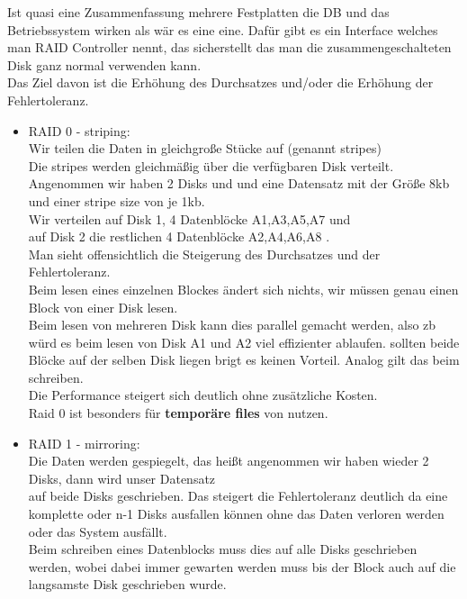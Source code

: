 \documentclass[12pt]{article}\pagestyle{myheadings}
\theoremstyle{plain}
\begin{document}
\begin{enumerate}
Ist quasi eine Zusammenfassung mehrere Festplatten die DB und das Betriebssystem wirken als wär es eine eine.
Dafür gibt es ein Interface welches man RAID Controller nennt, das sicherstellt das man die zusammengeschalteten Disk ganz normal verwenden kann.\\
Das Ziel davon ist die Erhöhung des Durchsatzes und/oder die Erhöhung der Fehlertoleranz.\\
\begin{itemize}
\item RAID 0 - striping:\\
Wir teilen die Daten in gleichgroße Stücke auf (genannt \textsf{stripes}) \\
Die stripes werden gleichmäßig über die verfügbaren Disk verteilt.\\
Angenommen wir haben 2 Disks und und eine Datensatz mit der Größe 8kb und einer stripe size von je  1kb.\\
Wir verteilen auf Disk 1, 4 Datenblöcke A1,A3,A5,A7 und\\ auf Disk 2 die restlichen 4 Datenblöcke A2,A4,A6,A8 .\\
Man sieht offensichtlich die Steigerung des Durchsatzes und der Fehlertoleranz.\\
Beim lesen eines einzelnen Blockes ändert sich nichts, wir müssen genau einen Block von einer Disk lesen.\\
Beim lesen von mehreren Disk kann dies parallel gemacht werden, also zb würd es beim lesen von Disk A1 und A2 viel effizienter ablaufen. sollten beide Blöcke auf der selben Disk liegen brigt es keinen Vorteil.
Analog gilt das beim schreiben.\\
Die Performance steigert sich deutlich ohne zusätzliche Kosten.\\
Raid 0 ist besonders für \textbf{temporäre files} von nutzen.\\
\item RAID 1 - mirroring:\\
Die Daten werden gespiegelt, das heißt angenommen wir haben wieder 2 Disks, dann wird unser Datensatz\\
auf beide Disks geschrieben. Das steigert die Fehlertoleranz deutlich da eine komplette oder n-1 Disks ausfallen können ohne das Daten verloren werden oder das System ausfällt. \\
Beim schreiben eines Datenblocks muss dies auf alle Disks geschrieben werden, wobei dabei immer gewarten werden muss bis der Block auch auf die langsamste Disk geschrieben wurde.\\

\end{itemize}
\end{enumerate}
\end{document}
